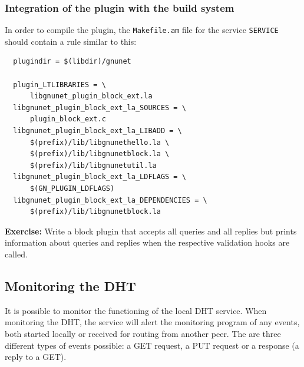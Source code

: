 \documentclass[10pt]{article}
\newcommand{\exercise}[1]{\noindent\begin{boxedminipage}{\textwidth}{\bf Exercise:} #1 \end{boxedminipage}}
\begin{document}
\subsubsection{Integration of the plugin with the build system}

In order to compile the plugin, the {\tt Makefile.am} file for the
service \texttt{SERVICE} should contain a rule similar to this:

\lstset{language=make}
\begin{lstlisting}
  plugindir = $(libdir)/gnunet

  plugin_LTLIBRARIES = \
	  libgnunet_plugin_block_ext.la
  libgnunet_plugin_block_ext_la_SOURCES = \
	  plugin_block_ext.c
  libgnunet_plugin_block_ext_la_LIBADD = \
	  $(prefix)/lib/libgnunethello.la \
	  $(prefix)/lib/libgnunetblock.la \
	  $(prefix)/lib/libgnunetutil.la
  libgnunet_plugin_block_ext_la_LDFLAGS = \
	  $(GN_PLUGIN_LDFLAGS)
  libgnunet_plugin_block_ext_la_DEPENDENCIES = \
	  $(prefix)/lib/libgnunetblock.la
\end{lstlisting}


\exercise{Write a block plugin that accepts all queries
and all replies but prints information about queries and replies
when the respective validation hooks are called.}



\subsection{Monitoring the DHT}
It is possible to monitor the functioning of the local DHT service. When monitoring
the DHT, the service will alert the monitoring program of any events,
both started locally or received for routing from another peer. The are three different
types of events possible: a GET request, a PUT request or a response (a reply to
a GET).
\end{document}
